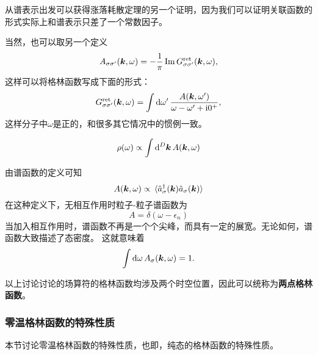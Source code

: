 \documentclass[hyperref, UTF8, a4paper]{ctexart}
\newcommand*{\ii}{\mathrm{i}}
\begin{document}
从谱表示出发可以获得涨落耗散定理的另一个证明，因为我们可以证明关联函数的形式实际上和谱表示只差了一个常数因子。

当然，也可以取另一个定义
\begin{equation}
    A_{\sigma \sigma'}(\vb*{k}, \omega) = - \frac{1}{\pi} \Im G^\text{ret}_{\sigma \sigma'}(\vb*{k}, \omega),
\end{equation}
这样可以将格林函数写成下面的形式：
\begin{equation}
    G^\text{ret}_{\sigma \sigma'}(\vb*{k}, \omega) = \int \dd{\omega'} \frac{A(\vb*{k}, \omega')}{\omega - \omega' + \ii 0^+},
\end{equation}
这样分子中$\omega$是正的，和很多其它情况中的惯例一致。

\[
    \rho(\omega) \propto \int \dd[D]{\vb*{k}} A(\vb*{k}, \omega)
\]

由谱函数的定义可知
\[
    A(\vb*{k}, \omega) \propto \expval*{\hat{a}_\sigma^\dagger(\vb*{k}) \hat{a}_\sigma(\vb*{k})}
\]
在这种定义下，无相互作用时粒子-粒子谱函数为
\begin{equation}
    A = \delta(\omega - \epsilon_n)
\end{equation}
当加入相互作用时，谱函数不再是一个个尖峰，而具有一定的展宽。无论如何，谱函数大致描述了态密度。
这就意味着
\begin{equation}
    \int \dd{\omega} A_{\sigma}(\vb*{k}, \omega) = 1.
\end{equation}

以上讨论讨论的场算符的格林函数均涉及两个时空位置，因此可以统称为\textbf{两点格林函数}。

\subsubsection{零温格林函数的特殊性质}

本节讨论零温格林函数的特殊性质，也即，纯态的格林函数的特殊性质。
\end{document}
